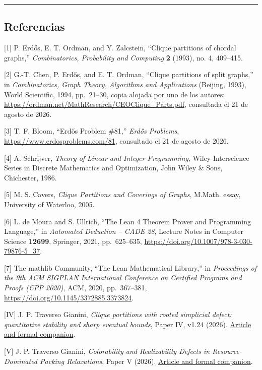 \documentclass[spanish,11pt,a4paper]{article}
\begin{document}
\begin{center}\rule{0.5\linewidth}{0.5pt}\end{center}

\subsection{Referencias}\label{referencias}

{[}1{]} P. Erdős, E. T. Ordman, and Y. Zalcstein, ``Clique partitions of
chordal graphs,'' \emph{Combinatorics, Probability and Computing}
\textbf{2} (1993), no. 4, 409--415.

{[}2{]} G.-T. Chen, P. Erdős, and E. T. Ordman, ``Clique partitions of
split graphs,'' in \emph{Combinatorics, Graph Theory, Algorithms and
Applications} (Beijing, 1993), World Scientific, 1994, pp.~21--30, copia
alojada por uno de los autores:
\url{https://ordman.net/MathResearch/CEOClique_Parts.pdf}, consultada el
21 de agosto de 2026.

{[}3{]} T. F. Bloom, ``Erdős Problem \#81,'' \emph{Erdős Problems},
\url{https://www.erdosproblems.com/81}, consultado el 21 de agosto de
2026.

{[}4{]} A. Schrijver, \emph{Theory of Linear and Integer Programming},
Wiley-Interscience Series in Discrete Mathematics and Optimization, John
Wiley \& Sons, Chichester, 1986.

{[}5{]} M. S. Cavers, \emph{Clique Partitions and Coverings of Graphs},
M.Math. essay, University of Waterloo, 2005.

{[}6{]} L. de Moura and S. Ullrich, ``The Lean 4 Theorem Prover and
Programming Language,'' in \emph{Automated Deduction -- CADE 28},
Lecture Notes in Computer Science \textbf{12699}, Springer, 2021,
pp.~625--635, \url{https://doi.org/10.1007/978-3-030-79876-5_37}.

{[}7{]} The mathlib Community, ``The Lean Mathematical Library,'' in
\emph{Proceedings of the 9th ACM SIGPLAN International Conference on
Certified Programs and Proofs (CPP 2020)}, ACM, 2020, pp.~367--381,
\url{https://doi.org/10.1145/3372885.3373824}.

{[}IV{]} J. P. Traverso Gianini, \emph{Clique partitions with rooted
simplicial defect: quantitative stability and sharp eventual bounds},
Paper IV, v1.24 (2026).
\href{https://github.com/jtraverso/erdos-81-chordal-clique-partitions/tree/eb335845bfa23375d5040ea31fc4f4b366346287/preprints/PAPER_IV}{Article
and formal companion}.

{[}V{]} J. P. Traverso Gianini, \emph{Colorability and Realizability
Defects in Resource-Dominated Packing Relaxations}, Paper V (2026).
\href{https://github.com/jtraverso/erdos-81-chordal-clique-partitions/tree/eb335845bfa23375d5040ea31fc4f4b366346287/preprints/PAPER_V}{Article
and formal companion}.
\end{document}
